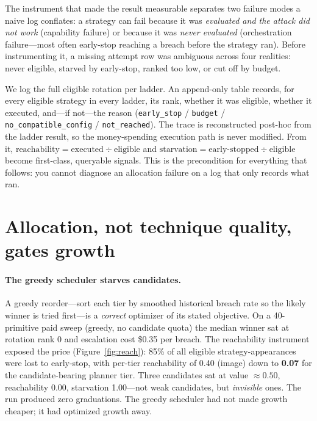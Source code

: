 \documentclass[11pt]{article}
\begin{document}
The instrument that made the result measurable separates two failure modes a naive log conflates: a strategy can fail because it was \emph{evaluated and the attack did not work} (capability failure) or because it was \emph{never evaluated} (orchestration failure---most often early-stop reaching a breach before the strategy ran). Before instrumenting it, a missing attempt row was ambiguous across four realities: never eligible, starved by early-stop, ranked too low, or cut off by budget.

We log the full eligible rotation per ladder. An append-only table records, for every eligible strategy in every ladder, its rank, whether it was eligible, whether it executed, and---if not---the reason (\texttt{early\_stop} / \texttt{budget} / \texttt{no\_compatible\_config} / \texttt{not\_reached}). The trace is reconstructed post-hoc from the ladder result, so the money-spending execution path is never modified. From it, $\text{reachability} = \text{executed} \div \text{eligible}$ and $\text{starvation} = \text{early-stopped} \div \text{eligible}$ become first-class, queryable signals. This is the precondition for everything that follows: you cannot diagnose an allocation failure on a log that only records what ran.

\section{Allocation, not technique quality, gates growth}

\paragraph{The greedy scheduler starves candidates.} A greedy reorder---sort each tier by smoothed historical breach rate so the likely winner is tried first---is a \emph{correct} optimizer of its stated objective. On a 40-primitive paid sweep (greedy, no candidate quota) the median winner sat at rotation rank 0 and escalation cost \$0.35 per breach. The reachability instrument exposed the price (Figure~\ref{fig:reach}): 85\% of all eligible strategy-appearances were lost to early-stop, with per-tier reachability of 0.40 (image) down to \textbf{0.07} for the candidate-bearing planner tier. Three candidates sat at value $\approx0.50$, reachability 0.00, starvation 1.00---not weak candidates, but \emph{invisible} ones. The run produced zero graduations. The greedy scheduler had not made growth cheaper; it had optimized growth away.
\end{document}

